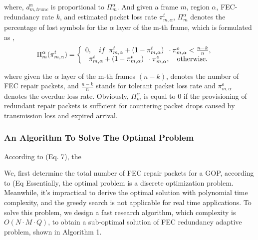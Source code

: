 where, $d_{m,trunc}^\alpha$ is proportional to $\Pi _m^\alpha$. And given a frame $m$, region $\alpha$, FEC-redundancy rate $k$, and estimated packet loss rate $\pi _{m,\alpha }^t$,
$\Pi _m^\alpha$ denotes the percentage of lost symbols for the $\alpha$ layer of the m-th frame, which is
formulated as ,
\begin{eqnarray}
&\Pi _m^\alpha (\pi _{m,\alpha }^t) = \left\{ {\begin{array}{*{20}{l}}
{0,\begin{array}{*{20}{c}}
{}
\end{array}if\begin{array}{*{20}{c}}
{\pi _{m,\alpha }^t + (1 - \pi _{m,\alpha }^t)}
\end{array}\cdot\pi _{m,\alpha }^o < \frac{{n - k}}{n},}\\
{\begin{array}{*{20}{c}}
{\pi _{m,\alpha }^t + (1 - \pi _{m,\alpha }^t)}
\end{array} \cdot \pi _{m,\alpha }^o,\begin{array}{*{20}{c}}
{}
\end{array}{\rm{otherwise}}.}
\end{array}} \right.
\end{eqnarray}

where given the $\alpha$ layer of the m-th frames $(n-k)$, denotes the number of FEC repair packets, and $\frac{{n - k}}{n}$ stands for tolerant packet loss rate and $\pi _{m,\alpha }^o$ denotes the overdue loss rate. Obviously, $\Pi _m^\alpha$ is equal to 0 if the provisioning of redundant repair packets is sufficient for countering packet drops caused by transmission loss and expired arrival. 



\subsubsection{An Algorithm To Solve The Optimal Problem}
According to (Eq. 7), the 



We, first determine the total number of FEC repair packets for a GOP, according to (Eq
Essentially, the optimal problem is a discrete optimization problem. Meanwhile, it's impractical to derive the optimal solution with polynomial time complexity, and the greedy search is not applicable for real time applications. To solve this problem, we design a fast research algorithm, which complexity is $O(N \cdot M \cdot Q)$, to obtain a sub-optimal solution of FEC redundancy adaptive problem, shown in Algorithm 1. 


